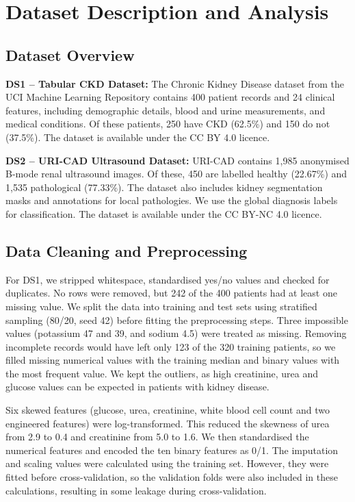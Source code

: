 \section{Dataset Description and Analysis}

\subsection{Dataset Overview}

\textbf{DS1 -- Tabular CKD Dataset:} The Chronic Kidney Disease dataset from the UCI Machine Learning Repository\cite{rubini2015} contains 400 patient records and 24 clinical features, including demographic details, blood and urine measurements, and medical conditions. Of these patients, 250 have CKD (62.5\%) and 150 do not (37.5\%). The dataset is available under the CC BY 4.0 licence.

\textbf{DS2 -- URI-CAD Ultrasound Dataset:} URI-CAD\cite{uricad2024} contains 1,985 anonymised B-mode renal ultrasound images. Of these, 450 are labelled healthy (22.67\%) and 1,535 pathological (77.33\%). The dataset also includes kidney segmentation masks and annotations for local pathologies. We use the global diagnosis labels for classification. The dataset is available under the CC BY-NC 4.0 licence.

\subsection{Data Cleaning and Preprocessing}

For DS1, we stripped whitespace, standardised yes/no values and checked for duplicates. No rows were removed, but 242 of the 400 patients had at least one missing value. We split the data into training and test sets using stratified sampling (80/20, seed 42) before fitting the preprocessing steps. Three impossible values (potassium 47 and 39, and sodium 4.5) were treated as missing. Removing incomplete records would have left only 123 of the 320 training patients, so we filled missing numerical values with the training median and binary values with the most frequent value. We kept the outliers, as high creatinine, urea and glucose values can be expected in patients with kidney disease.

Six skewed features (glucose, urea, creatinine, white blood cell count and two engineered features) were log-transformed. This reduced the skewness of urea from 2.9 to 0.4 and creatinine from 5.0 to 1.6. We then standardised the numerical features and encoded the ten binary features as 0/1. The imputation and scaling values were calculated using the training set. However, they were fitted before cross-validation, so the validation folds were also included in these calculations, resulting in some leakage during cross-validation.

